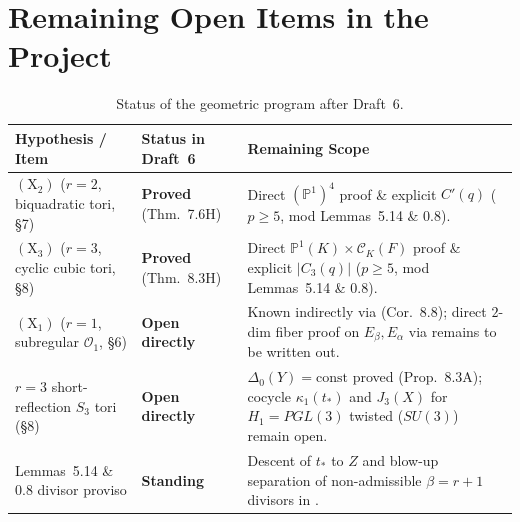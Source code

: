 \documentclass[11pt,letterpaper]{article}
\newcommand{\ooo}{\mathcal{O}}
\begin{document}
\section{Remaining Open Items in the Project}

\begin{table}[!htbp]
\centering
\small
\begin{tabularx}{\linewidth}{@{}l l X@{}}
\toprule
\textbf{Hypothesis / Item} & \textbf{Status in Draft~6} & \textbf{Remaining Scope} \\
\midrule
$(\mathrm{X}_2)$ ($r=2$, biquadratic tori, \S7) & {\color{okgreen}\textbf{Proved}} (Thm.~7.6H) & Direct $(\mathbb{P}^1)^4$ proof \& explicit $C'(q)$ ($p\ge 5$, mod Lemmas~5.14 \& 0.8). \\
$(\mathrm{X}_3)$ ($r=3$, cyclic cubic tori, \S8) & {\color{okgreen}\textbf{Proved}} (Thm.~8.3H) & Direct $\mathbb{P}^1(K)\times\mathcal{C}_K(F)$ proof \& explicit $|C_3(q)|$ ($p\ge 5$, mod Lemmas~5.14 \& 0.8). \\
$(\mathrm{X}_1)$ ($r=1$, subregular $\ooo_1$, \S6) & {\color{accent}\textbf{Open directly}} & Known indirectly via \cite{Wa97,Ng10,GH16} (Cor.~8.8); direct $2$-dim fiber proof on $E_\beta,E_\alpha$ via \cite{Ha92a} remains to be written out. \\
$r=3$ short-reflection $S_3$ tori (\S8) & {\color{accent}\textbf{Open directly}} & $\Delta_0(Y)=\text{const}$ proved (Prop.~8.3A); cocycle $\kappa_1(t_*)$ and $J_3(X)$ for $H_1=PGL(3)$ twisted ($SU(3)$) remain open. \\
Lemmas~5.14 \& 0.8 divisor proviso & {\color{accent}\textbf{Standing}} & Descent of $t_*$ to $Z$ and blow-up separation of non-admissible $\beta=r+1$ divisors in \cite{LS83}. \\
\bottomrule
\end{tabularx}
\caption{Status of the geometric program after Draft~6.}
\end{table}
\end{document}
